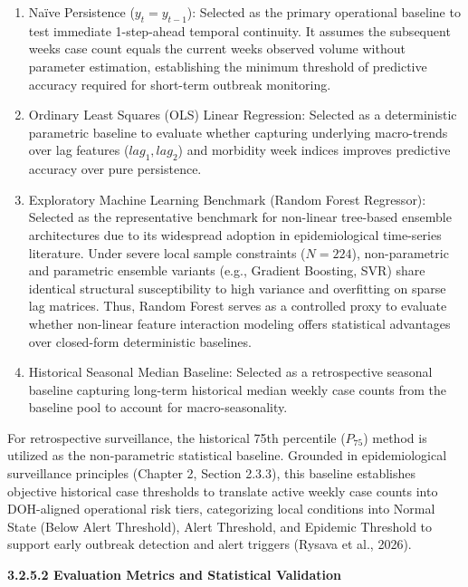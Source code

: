 \documentclass[
]{article}
\begin{document}
\begin{enumerate}
\def\labelenumi{\arabic{enumi}.}
\item
  Naïve Persistence (\(y_{t} = y_{t - 1}\)): Selected as the primary
  operational baseline to test immediate 1-step-ahead temporal
  continuity. It assumes the subsequent week\textquotesingle s case
  count equals the current week\textquotesingle s observed volume
  without parameter estimation, establishing the minimum threshold of
  predictive accuracy required for short-term outbreak monitoring.
\item
  Ordinary Least Squares (OLS) Linear Regression: Selected as a
  deterministic parametric baseline to evaluate whether capturing
  underlying macro-trends over lag features (\(lag_{1},lag_{2}\)) and
  morbidity week indices improves predictive accuracy over pure
  persistence.
\item
  Exploratory Machine Learning Benchmark (Random Forest Regressor):
  Selected as the representative benchmark for non-linear tree-based
  ensemble architectures due to its widespread adoption in
  epidemiological time-series literature. Under severe local sample
  constraints (\(N = 224\)), non-parametric and parametric ensemble
  variants (e.g., Gradient Boosting, SVR) share identical structural
  susceptibility to high variance and overfitting on sparse lag
  matrices. Thus, Random Forest serves as a controlled proxy to evaluate
  whether non-linear feature interaction modeling offers statistical
  advantages over closed-form deterministic baselines.
\item
  Historical Seasonal Median Baseline: Selected as a retrospective
  seasonal baseline capturing long-term historical median weekly case
  counts from the baseline pool to account for macro-seasonality.
\end{enumerate}

For retrospective surveillance, the historical 75th percentile
(\(P_{75}\)) method is utilized as the non-parametric statistical
baseline. Grounded in epidemiological surveillance principles (Chapter
2, Section 2.3.3), this baseline establishes objective historical case
thresholds to translate active weekly case counts into DOH-aligned
operational risk tiers, categorizing local conditions into Normal State
(Below Alert Threshold), Alert Threshold, and Epidemic Threshold to
support early outbreak detection and alert triggers (Rysava et al.,
2026).

\textbf{3.2.5.2 Evaluation Metrics and Statistical Validation}
\end{document}

